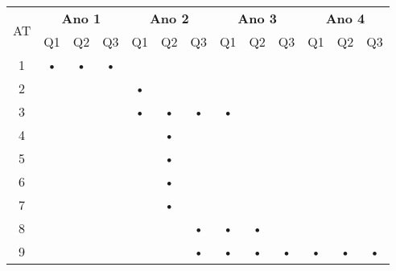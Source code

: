 \documentclass[12pt]{article}
\begin{document}
\begin{table}[htbp]
	\centering
		\begin{tabular}{|c|c|c|c|c|c|c|c|c|c|c|c|c|}
		\hline
		\multirow{2}{*}{AT} & \multicolumn{3}{c|}{\textbf{Ano 1}} & \multicolumn{3}{c|}{\textbf{Ano 2}} & \multicolumn{3}{c|}{\textbf{Ano 3}} & \multicolumn{3}{c|}{\textbf{Ano 4}} \\ \cline{2-13} 
												& Q1         & Q2         & Q3        & Q1         & Q2         & Q3        & Q1         & Q2         & Q3        & Q1         & Q2         & Q3        \\ \hline
		1                   & •          & •          & •         &            &            &           &            &            &           &            &            &           \\ \hline
		2                   &            &            &           & •          &            &           &            &            &           &            &            &           \\ \hline
		3                   &            &            &           & •          & •          & •         & •          &            &           &            &            &           \\ \hline
		4                   &            &            &           &            & •          &           &            &            &           &            &            &           \\ \hline
		5                   &            &            &           &            & •          &           &            &            &           &            &            &           \\ \hline
		6                   &            &            &           &            & •          &           &            &            &           &            &            &           \\ \hline
		7                   &            &            &           &            & •          &           &            &            &           &            &            &           \\ \hline
		8                   &            &            &           &            &            & •         & •          & •          &           &            &            &           \\ \hline
	  9                   &            &            &           &            &            & •         & •          & •          & •         & •          & •          & •         \\ \hline

\end{tabular}
\end{table}
\end{document}
